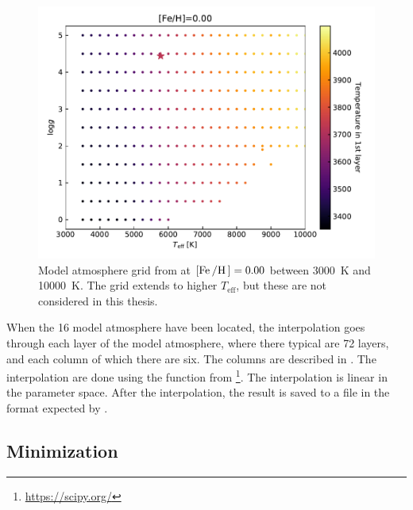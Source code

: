 \begin{figure}[htpb!]
    \centering
    \includegraphics[width=1.0\linewidth]{figures/model_atmosphere.pdf}
    \caption{Model atmosphere grid from \citet{Kurucz1993} at
             $[\ion{Fe}/\ion{H}]=0.00$ between \SI{3000}{K} and \SI{10000}{K}.
             The grid extends to higher $T_\mathrm{eff}$, but these are not
             considered in this thesis.}
    \label{fig:grid}
\end{figure}

When the 16 model atmosphere have been located, the interpolation goes through
each layer of the model atmosphere, where there typical are 72 layers, and each
column of which there are six. The columns are described in
. The interpolation are done using the
 function from \footnote{\url{https://scipy.org/}}.
The interpolation is linear in the parameter space. After the interpolation, the
result is saved to a file in the format expected by \MOOG.






\subsection{Minimization}

